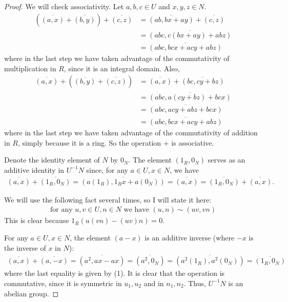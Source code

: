 \documentclass[10pt]{article}
\renewcommand{\bar}{\overline}
\begin{document}
\begin{enumerate}
\begin{proof}
We will check associativity.  Let $a,b,c \in U$ and $x,y,z \in N$.
\begin{align*}
(\bar{(a,x)} + \bar{(b,y)}) + \bar{(c,z)} &= \bar{(ab,bx + ay)} + \bar{(c,z)}
\\
&= \bar{(abc,c(bx+ay)+abz)}
\\
&= \bar{(abc, bcx + acy + abz)}
\end{align*}
where in the last step we have taken advantage of the commutativity of multiplication in $R$, since it is an integral domain.  Also,
\begin{align*}
\bar{(a,x)} + (\bar{(b,y)} + \bar{(c,z)}) &=
\bar{(a,x)} + \bar{(bc,cy + bz)}
\\
&= \bar{(abc,a(cy+bz) + bcx)}
\\
&= \bar{(abc,acy + abz + bcx)}
\\
&= \bar{(abc,bcx + acy + abz)}
\end{align*}
where in the last step we have taken advantage of the commutativity of addition in $R$, simply because it is a ring.  So the operation $+$ is associative.

Denote the identity element of $N$ by $0_N$.  The element $(1_R,0_N)$ serves as an additive identity in $U^{-1}N$ since, for any $a \in U, x \in N$, we have
\begin{align*}
\bar{(a,x)} + \bar{(1_R,0_N)} = \bar{(a(1_R), 1_Rx + a(0_N))} = \bar{(a,x)} = \bar{(1_R,0_N)} + \bar{(a,x)}.
\end{align*}

We will use the following fact several times, so I will state it here:
\begin{align}
\text{for any } u,v \in U, n \in N \text{ we have } (u,n) \sim (uv,vn)
\end{align}
This is clear because $1_R(u(vn) - (uv)n) = 0$.

For any $a \in U, x \in N$, the element $(a-x)$ is an additive inverse (where $-x$ is the inverse of $x$ in $N$):
\begin{align*}
\bar{(a,x)} + \bar{(a,-x)} = \bar{(a^2,ax - ax)} = \bar{(a^2,0_N)} = \bar{(a^2 (1_R), a^2(0_N))} = \bar{(1_R, 0_N)}
\end{align*}
where the last equality is given by (1).  It is clear that the operation is commutative, since it is symmetric in $u_1,u_2$ and in $n_1,n_2$.  Thus, $U^{-1}N$ is an abelian group.


\end{proof}
\end{enumerate}
\end{document}
